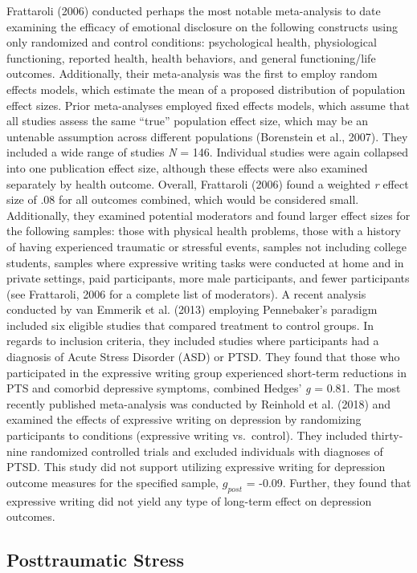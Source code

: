 \documentclass[man, mask]{apa6}
\theoremstyle{definition}
\theoremstyle{definition}
\theoremstyle{definition}
\theoremstyle{remark}
\begin{document}
Frattaroli (2006) conducted perhaps the most notable meta-analysis to
date examining the efficacy of emotional disclosure on the following
constructs using only randomized and control conditions: psychological
health, physiological functioning, reported health, health behaviors,
and general functioning/life outcomes. Additionally, their meta-analysis
was the first to employ random effects models, which estimate the mean
of a proposed distribution of population effect sizes. Prior
meta-analyses employed fixed effects models, which assume that all
studies assess the same \enquote{true} population effect size, which may
be an untenable assumption across different populations (Borenstein et
al., 2007). They included a wide range of studies \emph{N} = 146.
Individual studies were again collapsed into one publication effect
size, although these effects were also examined separately by health
outcome. Overall, Frattaroli (2006) found a weighted \emph{r} effect
size of .08 for all outcomes combined, which would be considered small.
Additionally, they examined potential moderators and found larger effect
sizes for the following samples: those with physical health problems,
those with a history of having experienced traumatic or stressful
events, samples not including college students, samples where expressive
writing tasks were conducted at home and in private settings, paid
participants, more male participants, and fewer participants (see
Frattaroli, 2006 for a complete list of moderators). A recent analysis
conducted by van Emmerik et al. (2013) employing Pennebaker's paradigm
included six eligible studies that compared treatment to control groups.
In regards to inclusion criteria, they included studies where
participants had a diagnosis of Acute Stress Disorder (ASD) or PTSD.
They found that those who participated in the expressive writing group
experienced short-term reductions in PTS and comorbid depressive
symptoms, combined Hedges' \emph{g} = 0.81. The most recently published
meta-analysis was conducted by Reinhold et al. (2018) and examined the
effects of expressive writing on depression by randomizing participants
to conditions (expressive writing vs.~control). They included
thirty-nine randomized controlled trials and excluded individuals with
diagnoses of PTSD. This study did not support utilizing expressive
writing for depression outcome measures for the specified sample,
\(g_{post}\) = -0.09. Further, they found that expressive writing did
not yield any type of long-term effect on depression outcomes.

\subsection{Posttraumatic Stress}\label{posttraumatic-stress}
\end{document}
